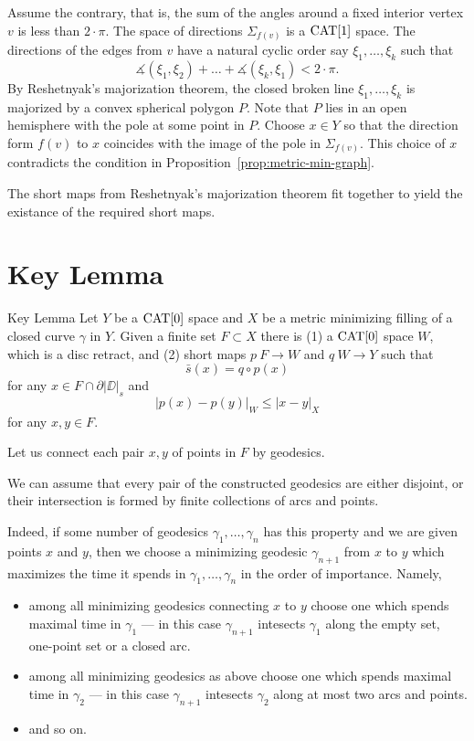 \documentclass{article}
\begin{document}
Assume the contrary, that is, 
the sum of the angles around a fixed interior vertex $v$ is less than $2\cdot\pi$.
The space of directions $\Sigma_{f(v)}$ is a $\mathop{\rm CAT}\nolimits[1]$ space.
The directions of the edges from $v$ have a natural
cyclic order say $\xi_1,\dots,\xi_k$
such that
\[\measuredangle(\xi_1,\xi_2)+\dots+\measuredangle(\xi_k,\xi_1)<2\cdot\pi.\]
By Reshetnyak's majorization theorem,
the closed broken line $\xi_1,\dots,\xi_k$ is majorized by a convex spherical polygon $P$.
Note that $P$ lies in an open hemisphere with the pole  at some point in $P$.
Choose $x\in Y$ so that the direction form $f(v)$ to $x$ coincides with the image of the pole in $\Sigma_{f(v)}$.
This choice of $x$ contradicts the condition in Proposition~\ref{prop:metric-min-graph}.

The short maps from Reshetnyak's majorization theorem fit together to yield the existance of the required short maps.
\qeds

\section{Key Lemma}\label{Key Lemma}


\begin{thm}{Key Lemma}\label{lem:key}
Let $Y$ be a $\mathop{\rm CAT}\nolimits[0]$ space and $X$ 
be a metric minimizing filling of a closed curve $\gamma$ in $Y$.
Given a finite set $F\subset X$ 
there is 
(1) a $\mathop{\rm CAT}\nolimits[0]$ space $W$, which is a disc retract,
and (2) short maps $p\:F\to W$ and $q\:W\to Y$ such that
\[\bar s(x)=q\circ p(x)\] 
for any $x\in F\cap \partial |\DD|_s$
and 
\[|p(x)-p(y)|_W\le |x-y|_X\] 
for any $x,y\in F$.
\end{thm}

Let us connect each pair $x,y$ of points in $F$ by geodesics.

We can assume that 
every pair of the constructed geodesics 
are either disjoint, or their intersection is formed by finite collections of arcs and points.

Indeed, if some number of geodesics $\gamma_1,\dots,\gamma_n$ has this property and we are given points $x$ and $y$, then
we choose a minimizing geodesic $\gamma_{n+1}$ from $x$ to $y$ which maximizes the time it spends in $\gamma_1,\dots,\gamma_n$  in the order of importance.
Namely, 
\begin{itemize}
\item  among all minimizing geodesics connecting $x$ to $y$
choose one which spends maximal time in $\gamma_1$ --- in this case $\gamma_{n+1}$ intesects $\gamma_1$ along the empty set, one-point set or a closed arc.
\item among all minimizing geodesics as above
choose one which spends maximal time in $\gamma_2$ --- in this case $\gamma_{n+1}$ intesects $\gamma_2$ along at most two arcs and points.
\item and so on.
\end{itemize}
\end{document}
